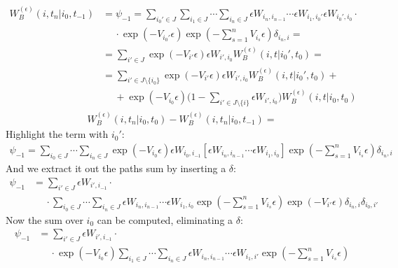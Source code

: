 \documentclass[../template.tex]{subfiles}
\begin{document}
\begin{exo}
    \begin{align*}
        W_B^{(\epsilon)}(i,t_n|i_0,t_{-1}) &= \psi_{-1} = \sum_{i_0' \in J} \sum_{i_1 \in J} \cdots \sum_{i_n \in J} \epsilon W_{i_n, i_{n-1}} \cdots \epsilon W_{i_1,i_0'}\epsilon W_{i_0', i_0} \cdot \\
        &\quad \>\cdot \exp(-V_{i_0'}\epsilon)\exp\left(-\sum_{s=1}^n V_{i_s} \epsilon\right) \delta_{i_n,i} = \\
        &= \sum_{i' \in J} \exp(-V_{i'}\epsilon) \epsilon W_{i',i_0} W_B^{(\epsilon)}(i,t|i_0',t_0) =\\
        &= \sum_{i' \in J\setminus \{i_0\}} \exp(-V_{i'}\epsilon) \epsilon W_{i',i_0} W_B^{(\epsilon)}(i,t|i_0',t_0) + \\
        &\quad \> + \exp(-V_{i_0}\epsilon)\Big(1-\sum_{i' \in J\setminus \{i\}} \epsilon W_{i',i_0}\Big) W_B^{(\epsilon)}(i,t|i_0,t_0)
    \end{align*}   
    \begin{align*}
        W_B^{(\epsilon)}(i,t_n|i_0,t_0) - W_B^{(\epsilon)}(i,t_n|i_0,t_{-1}) = 
    \end{align*}
    Highlight the term with $i_0'$:
    \begin{align*}
        \psi_{-1} = \sum_{i_0 \in J} \cdots \sum_{i_n \in J} \exp(-V_{i_0} \epsilon) \epsilon W_{i_0,i_{-1}} \left[\epsilon W_{i_n, i_{n-1}} \cdots \epsilon W_{i_1,i_0}\right] \exp\left(-\sum_{s=1}^n V_{i_s} \epsilon\right) \delta_{i_n,i}
    \end{align*}
    And we extract it out the paths sum by inserting a $\delta$:
    \begin{align*}
        \psi_{-1} &= \sum_{i' \in J} \epsilon W_{i',i_{-1}} \cdot \\
        &\quad \> \cdot \sum_{i_0 \in J} \cdots \sum_{i_n \in J} \epsilon W_{i_n, i_{n-1}} \cdots \epsilon W_{i_1,i_0} \exp\left(-\sum_{s=1}^n V_{i_s} \epsilon\right) \exp(-V_{i'} \epsilon) \delta_{i_n,i} \delta_{i_0,i'}
    \end{align*}
    Now the sum over $i_0$ can be computed, eliminating a $\delta$:
    \begin{align*}
        \psi_{-1} &= \sum_{i' \in J} \epsilon W_{i',i_{-1}} \cdot \\
        &\quad \> \cdot \exp(-V_{i_0}\epsilon)\sum_{i_1 \in J}\cdots \sum_{i_n \in J} \epsilon W_{i_n, i_{n-1}}\cdots \epsilon W_{i_1, i'} \exp\left(-\sum_{s=1}^n V_{i_s} \epsilon\right)
    \end{align*}

\end{exo}


\listoftheorems
\end{document}
